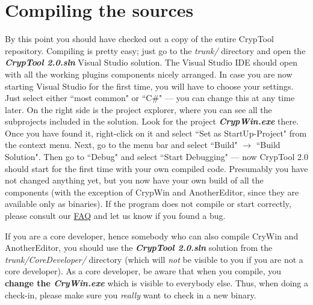 \section{Compiling the sources}
\label{CompilingTheSources}

By this point you should have checked out a copy of the entire CrypTool repository. Compiling is pretty easy; just go to the \textit{trunk/} directory and open the \textbf{\textit{CrypTool 2.0.sln}} Visual Studio solution. The Visual Studio IDE should open with all the working plugins components nicely arranged. In case you are now starting Visual Studio for the first time, you will have to choose your settings. Just select either ``most common" or ``C\#" --- you can change this at any time later. On the right side is the project explorer, where you can see all the subprojects included in the solution. Look for the project \textbf{\textit{CrypWin.exe}} there. Once you have found it, right-click on it and select ``Set as StartUp-Project" from the context menu. Next, go to the menu bar and select ``Build" $\rightarrow$ ``Build Solution". Then go to ``Debug" and select ``Start Debugging" --- now CrypTool 2.0 should start for the first time with your own compiled code. Presumably you have not changed anything yet, but you now have your own build of all the components (with the exception of CrypWin and AnotherEditor, since they are available only as binaries). If the program does not compile or start correctly, please consult our \href{https://www.cryptool.org/trac/CrypTool2/wiki/FAQ}{FAQ} and let us know if you found a bug.

If you are a core developer, hence somebody who can also compile CryWin and AnotherEditor, you should use the \textbf{\textit{CrypTool 2.0.sln}} solution from the \textit{trunk/CoreDeveloper/} directory (which will \textit{not} be visible to you if you are not a core developer). As a core developer, be aware that when you compile, you \textbf{change the \textit{CryWin.exe}} which is visible to everybody else. Thus, when doing a check-in, please make sure you \textit{really} want to check in a new binary.
